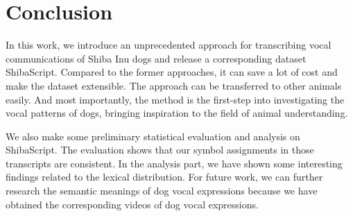 \section{Conclusion}
\label{sec:conclude}  
In this work, we introduce an unprecedented approach for transcribing vocal communications of Shiba Inu dogs and release a corresponding dataset ShibaScript. Compared to the former approaches, it can save a lot of cost and make the dataset extensible. The approach can be transferred to other animals easily. And most importantly, the method is the first-step into investigating the vocal patterns of dogs, bringing inspiration to the field of animal understanding. 

We also make some preliminary statistical evaluation and analysis on ShibaScript. The evaluation shows that our symbol assignments in those transcripts are consistent. In the analysis part, we have shown some interesting findings related to the lexical distribution. For future work, we can further research the semantic meanings of dog vocal expressions because we have obtained the corresponding videos of dog vocal expressions. 

